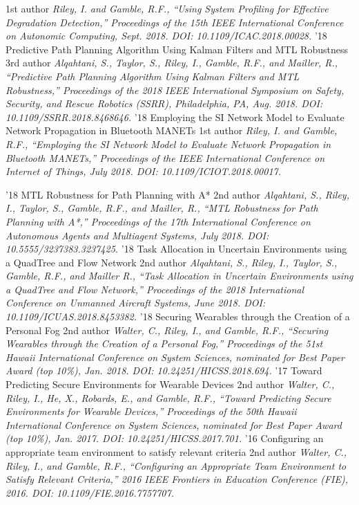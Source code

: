 \documentclass[print]{friggeri-cv}
\begin{document}
\begin{entrylist}
        {1st author}
        {\textit{Riley, I. and Gamble, R.F., “Using System Profiling for Effective Degradation Detection,” Proceedings of the 15th IEEE International Conference on Autonomic Computing, Sept. 2018. DOI: 10.1109/ICAC.2018.00028.}}
      \entry
        {'18}
        {Predictive Path Planning Algorithm Using Kalman Filters and MTL Robustness}
        {3rd author}
        {\textit{Alqahtani, S., Taylor, S., Riley, I., Gamble, R.F., and Mailler, R., “Predictive Path Planning Algorithm Using Kalman Filters and MTL Robustness,” Proceedings of the 2018 IEEE International Symposium on Safety, Security, and Rescue Robotics (SSRR), Philadelphia, PA, Aug. 2018. DOI: 10.1109/SSRR.2018.8468646.}}
      \entry
        {'18}
        {Employing the SI Network Model to Evaluate Network Propagation in Bluetooth MANETs}
        {1st author}
        {\textit{Riley, I. and Gamble, R.F., “Employing the SI Network Model to Evaluate Network Propagation in Bluetooth MANETs,” Proceedings of the IEEE International Conference on Internet of Things, July 2018. DOI: 10.1109/ICIOT.2018.00017.}}
    \end{entrylist}
    \begin{entrylist}
    \entry
        {'18}
        {MTL Robustness for Path Planning with A*}
        {2nd author}
        {\textit{Alqahtani, S., Riley, I., Taylor, S., Gamble, R.F., and Mailler, R., “MTL Robustness for Path Planning with A*,” Proceedings of the 17th International Conference on Autonomous Agents and Multiagent Systems, July 2018. DOI: 10.5555/3237383.3237425.}}
      \entry
        {'18}
        {Task Allocation in Uncertain Environments using a QuadTree and Flow Network}
        {2nd author}
        {\textit{Alqahtani, S., Riley, I., Taylor, S., Gamble, R.F., and Mailler R., “Task Allocation in Uncertain Environments using a QuadTree and Flow Network,” Proceedings of the 2018 International Conference on Unmanned Aircraft Systems, June 2018. DOI: 10.1109/ICUAS.2018.8453382.}}
      \entry
        {'18}
        {Securing Wearables through the Creation of a Personal Fog}
        {2nd author}
        {\textit{Walter, C., Riley, I., and Gamble, R.F., “Securing Wearables through the Creation of a Personal Fog,” Proceedings of the 51st Hawaii International Conference on System Sciences, nominated for Best Paper Award (top 10\%), Jan. 2018. DOI: 10.24251/HICSS.2018.694.}}
      \entry
        {'17}
        {Toward Predicting Secure Environments for Wearable Devices}
        {2nd author}
        {\textit{Walter, C., Riley, I., He, X., Robards, E., and Gamble, R.F., “Toward Predicting Secure Environments for Wearable Devices,” Proceedings of the 50th Hawaii International Conference on System Sciences, nominated for Best Paper Award (top 10\%), Jan. 2017. DOI: 10.24251/HICSS.2017.701.}}
      \entry
        {'16}
        {Configuring an appropriate team environment to satisfy relevant criteria}
        {2nd author}
        {\textit{Walter, C., Riley, I., and Gamble, R.F., “Configuring an Appropriate Team Environment to Satisfy Relevant Criteria,” 2016 IEEE Frontiers in Education Conference (FIE), 2016. DOI: 10.1109/FIE.2016.7757707.}}
      \end{entrylist}
\end{document}

